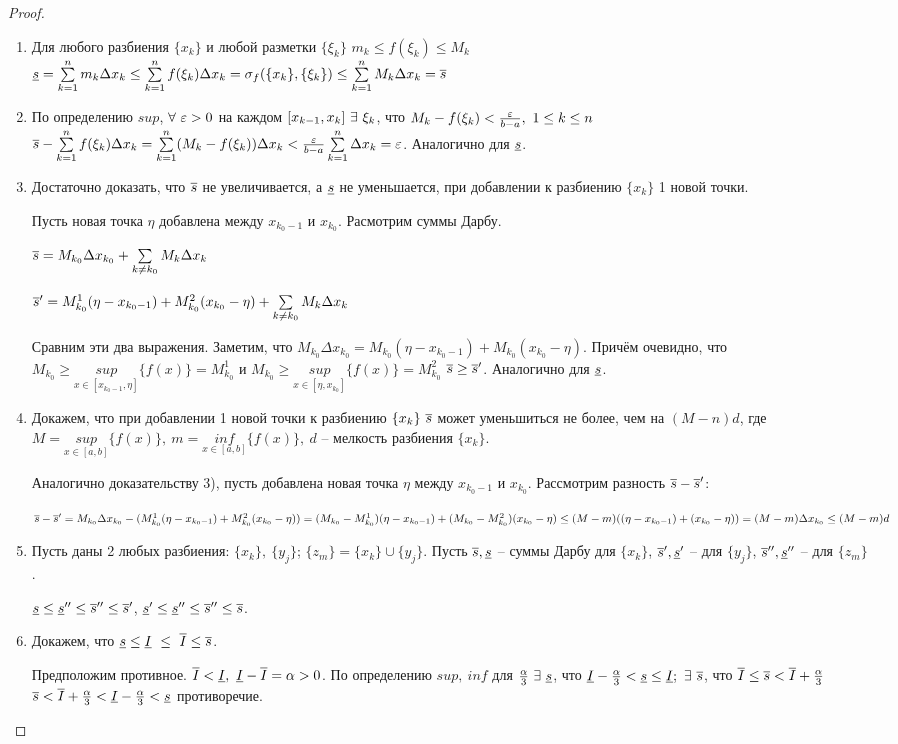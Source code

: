 \begin{proof}
\begin{enumerate}
\item Для любого разбиения $\{x_k\}$ и любой разметки $\{\xi_k\}$ $m_k\leq f(\xi_k)\leq M_k$ \then $\underline{s}=\sum\limits^n_{k=1}m_k\Delta x_k\leq\sum\limits^n_{k=1}f(\xi_k)\Delta x_k=\sigma_f(\{x_k\},\{\xi_k\})\leq\sum\limits^n_{k=1}M_k\Delta x_k=\overline{s}$
\item По определению $sup$, $\forall\ \varepsilon>0$ на каждом $[x_{k-1},x_k]\ \exists\ \xi_k$, что $M_k-f(\xi_k)<\frac{\varepsilon}{b-a},\ 1\leq k\leq n$ \then $\overline{s}-\sum\limits^n_{k=1}f(\xi_k)\Delta x_k=\sum\limits^n_{k=1}(M_k-f(\xi_k))\Delta x_k<\frac{\varepsilon}{b-a}\sum\limits^n_{k=1}\Delta x_k=\varepsilon$. Аналогично для $\underline{s}$.
\item Достаточно доказать, что $\overline{s}$ не увеличивается, а $\underline{s}$ не уменьшается, при добавлении к разбиению $\{x_k\}$ 1 новой точки.

Пусть новая точка $\eta$ добавлена между $x_{k_0-1}$ и $x_{k_0}$. Расмотрим суммы Дарбу.

$\overline{s}=M_{k_0}\Delta x_{k_0}+\sum\limits_{k\neq k_0}M_k\Delta x_k$

$\overline{s}'=M_{k_0}^1(\eta-x_{k_0-1})+M_{k_0}^2(x_{k_0}-\eta)+\sum\limits_{k\neq k_0}M_k\Delta x_k$

Сравним эти два выражения. Заметим, что $M_{k_0}\Delta x_{k_0}=M_{k_0}(\eta-x_{k_0-1})+M_{k_0}(x_{k_0}-\eta)$. Причём очевидно, что $M_{k_0}\geq\underset{x\in[x_{k_0-1},\eta]}{sup}\{f(x)\}=M_{k_0}^1$ и $M_{k_0}\geq\underset{x\in[\eta,x_{k_0}]}{sup}\{f(x)\}=M_{k_0}^2$ \then $\overline{s}\geq\overline{s}'$. Аналогично для $\underline{s}$.
\item Докажем, что при добавлении 1 новой точки к разбиению $\{x_k\}\ \overline{s}$ может уменьшиться не более, чем на $(M-n)d$, где $M=\underset{x\in[a,b]}{sup}\{f(x)\},\ m=\underset{x\in[a,b]}{inf}\{f(x)\},\ d$ -- мелкость разбиения $\{x_k\}$.

Аналогично доказательству 3), пусть добавлена новая точка $\eta$ между $x_{k_0-1}$ и $x_{k_0}$. Рассмотрим разность $\overline{s}-\overline{s}'$:

$\overline{s}-\overline{s}'=M_{k_0}\Delta x_{k_0}-(M^1_{k_0}(\eta-x_{k_0-1})+M^2_{k_0}(x_{k_0}-\eta))=(M_{k_0}-M^1_{k_0})(\eta-x_{k_0-1})+(M_{k_0}-M^2_{k_0})(x_{k_0}-\eta)\leq(M-m)((\eta-x_{k_0-1})+(x_{k_0}-\eta))=(M-m)\Delta x_{k_0}\leq(M-m)d$
\item Пусть даны 2 любых разбиения: $\{x_k\},\ \{y_j\}$; $\{z_m\}=\{x_k\}\cup\{y_j\}$. Пусть $\overline{s},\underline{s}$ -- суммы Дарбу для $\{x_k\}$, $\overline{s}',\underline{s}'$ -- для $\{y_j\}$, $\overline{s}'',\underline{s}''$ -- для $\{z_m\}$.

$\underline{s}\leq\underline{s}''\leq\overline{s}''\leq\overline{s}'$, $\underline{s}'\leq\underline{s}''\leq\overline{s}''\leq\overline{s}$.
\item Докажем, что $\ns\leq\nis\ \leq\ \vis\leq\vs$.

Предположим противное. $\vis<\nis,\ \nis-\vis=\alpha>0$. По определению $sup,\ inf$ для $\frac\alpha3\ \exists\ \underline{s}$, что $\nis-\frac\alpha3<\ns\leq\nis;\ \exists\ \vs$, что $\overline{I}\leq\overline{s}<\overline{I}+\frac\alpha3$ \then $\overline{s}<\overline{I}+\frac\alpha3<\underline{I}-\frac\alpha3<\underline{s}$ \then противоречие.
\end{enumerate}
\end{proof}
